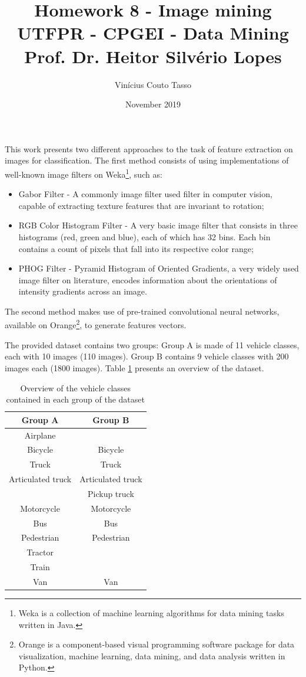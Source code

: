 \documentclass{article}
\title{Homework 8 - Image mining \\
        \vspace{5px} \large UTFPR - CPGEI - Data Mining \\
        Prof. Dr. Heitor Silvério Lopes}
\author{Vinícius Couto Tasso}
\date{November 2019}
\begin{document}
\maketitle

This work presents two different approaches to the task of feature extraction on images for classification. The first method consists of using implementations of well-known image filters on Weka\footnote{Weka is a collection of machine learning algorithms for data mining tasks written in Java.}, such as:

\begin{itemize}
    \item Gabor Filter - A commonly image filter used filter in computer vision, capable of extracting texture features that are invariant to rotation;
    \item RGB Color Histogram Filter - A very basic image filter that consists in three histograms (red, green and blue), each of which has 32 bins. Each bin contains a count of pixels that fall into its respective color range;
    \item PHOG Filter - Pyramid Histogram of Oriented Gradients, a very widely used image filter on literature, encodes information about the orientations of intensity gradients across an image.
\end{itemize}

The second method makes use of pre-trained convolutional neural networks, available on Orange\footnote{Orange is a component-based visual programming software package for data visualization, machine learning, data mining, and data analysis written in Python.}, to generate features vectors. 

The provided dataset contains two groups: Group A is made of 11 vehicle classes, each with 10 images (110 images). Group B contains 9 vehicle classes with 200 images each (1800 images). Table \ref{tab:dataset_overview} presents an overview of the dataset.

\begin{table}[h]
    \centering
    \begin{tabular}{c|c}
         \textbf{Group A} & \textbf{Group B} \\ \hline
        Airplane & \\
        Bicycle & Bicycle \\
        Truck & Truck \\
        Articulated truck & Articulated truck \\
        & Pickup truck \\
        Motorcycle & Motorcycle \\
        Bus & Bus \\
        Pedestrian & Pedestrian \\
        Tractor & \\
        Train & \\
        Van & Van \\
    \end{tabular}
    \caption{Overview of the vehicle classes contained in each group of the dataset}
    \label{tab:dataset_overview}
\end{table}
\end{document}
